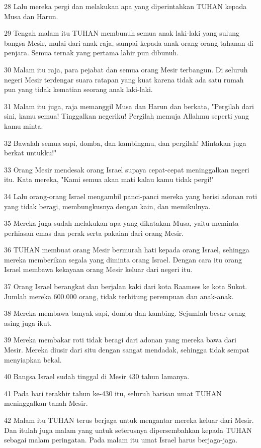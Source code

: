 \par 28 Lalu mereka pergi dan melakukan apa yang diperintahkan TUHAN kepada Musa dan Harun.
\par 29 Tengah malam itu TUHAN membunuh semua anak laki-laki yang sulung bangsa Mesir, mulai dari anak raja, sampai kepada anak orang-orang tahanan di penjara. Semua ternak yang pertama lahir pun dibunuh.
\par 30 Malam itu raja, para pejabat dan semua orang Mesir terbangun. Di seluruh negeri Mesir terdengar suara ratapan yang kuat karena tidak ada satu rumah pun yang tidak kematian seorang anak laki-laki.
\par 31 Malam itu juga, raja memanggil Musa dan Harun dan berkata, "Pergilah dari sini, kamu semua! Tinggalkan negeriku! Pergilah memuja Allahmu seperti yang kamu minta.
\par 32 Bawalah semua sapi, domba, dan kambingmu, dan pergilah! Mintakan juga berkat untukku!"
\par 33 Orang Mesir mendesak orang Israel supaya cepat-cepat meninggalkan negeri itu. Kata mereka, "Kami semua akan mati kalau kamu tidak pergi!"
\par 34 Lalu orang-orang Israel mengambil panci-panci mereka yang berisi adonan roti yang tidak beragi, membungkusnya dengan kain, dan memikulnya.
\par 35 Mereka juga sudah melakukan apa yang dikatakan Musa, yaitu meminta perhiasan emas dan perak serta pakaian dari orang Mesir.
\par 36 TUHAN membuat orang Mesir bermurah hati kepada orang Israel, sehingga mereka memberikan segala yang diminta orang Israel. Dengan cara itu orang Israel membawa kekayaan orang Mesir keluar dari negeri itu.
\par 37 Orang Israel berangkat dan berjalan kaki dari kota Raamses ke kota Sukot. Jumlah mereka 600.000 orang, tidak terhitung perempuan dan anak-anak.
\par 38 Mereka membawa banyak sapi, domba dan kambing. Sejumlah besar orang asing juga ikut.
\par 39 Mereka membakar roti tidak beragi dari adonan yang mereka bawa dari Mesir. Mereka diusir dari situ dengan sangat mendadak, sehingga tidak sempat menyiapkan bekal.
\par 40 Bangsa Israel sudah tinggal di Mesir 430 tahun lamanya.
\par 41 Pada hari terakhir tahun ke-430 itu, seluruh barisan umat TUHAN meninggalkan tanah Mesir.
\par 42 Malam itu TUHAN terus berjaga untuk mengantar mereka keluar dari Mesir. Dan itulah juga malam yang untuk seterusnya dipersembahkan kepada TUHAN sebagai malam peringatan. Pada malam itu umat Israel harus berjaga-jaga.
